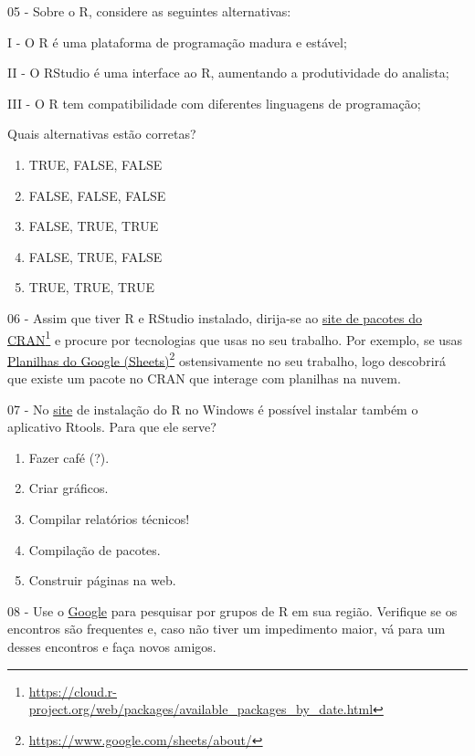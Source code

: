 \documentclass[
  11pt,
]{book}
\providecommand{\tightlist}{%
  \setlength{\itemsep}{0pt}\setlength{\parskip}{0pt}}
\begin{document}
05 -
Sobre o R, considere as seguintes alternativas:

I - O R é uma plataforma de programação madura e estável;

II - O RStudio é uma interface ao R, aumentando a produtividade do analista;

III - O R tem compatibilidade com diferentes linguagens de programação;

Quais alternativas estão corretas?

\begin{enumerate}
\def\labelenumi{\alph{enumi})}
\tightlist
\item
  TRUE, FALSE, FALSE
\item
  FALSE, FALSE, FALSE
\item
  FALSE, TRUE, TRUE
\item
  FALSE, TRUE, FALSE
\item
  TRUE, TRUE, TRUE
\end{enumerate}

06 -
Assim que tiver R e RStudio instalado, dirija-se ao \href{https://cloud.r-project.org/web/packages/available_packages_by_date.html}{site de pacotes do CRAN}\footnote{\url{https://cloud.r-project.org/web/packages/available_packages_by_date.html}} e procure por tecnologias que usas no seu trabalho. Por exemplo, se usas \href{https://www.google.com/sheets/about/}{Planilhas do Google (Sheets)}\footnote{\url{https://www.google.com/sheets/about/}} ostensivamente no seu trabalho, logo descobrirá que existe um pacote no CRAN que interage com planilhas na nuvem.

07 -
No \href{https://cloud.r-project.org/bin/windows/}{site} de instalação do R no Windows é possível instalar também o aplicativo Rtools. Para que ele serve?

\begin{enumerate}
\def\labelenumi{\alph{enumi})}
\tightlist
\item
  Fazer café (?).
\item
  Criar gráficos.
\item
  Compilar relatórios técnicos!
\item
  Compilação de pacotes.
\item
  Construir páginas na web.
\end{enumerate}

08 -
Use o \href{https://www.google.com/search?q=R+groups+in+my+city}{Google} para pesquisar por grupos de R em sua região. Verifique se os encontros são frequentes e, caso não tiver um impedimento maior, vá para um desses encontros e faça novos amigos.
\end{document}
